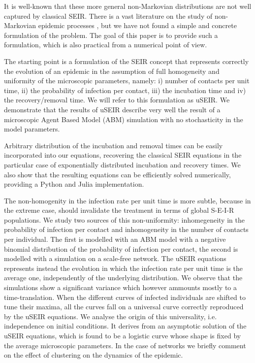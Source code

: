 \documentclass[a4paper,oneside,11pt]{article}
\begin{document}
It is well-known that these more general non-Markovian distributions are not well captured by classical SEIR. There is a vast literature on the study of non-Markovian epidemic processes \cite{}, but we have not found  a simple and concrete formulation of the problem. The goal of this paper is to provide such a formulation, which is also practical from a numerical point of view.  


The starting point is a formulation of the SEIR concept that   
represents correctly the evolution of an epidemic in the assumption of full homogeneity and uniformity of the microscopic parameters, namely: i) number of contacts per unit time, ii) the probability of infection per contact, iii) the incubation time and iv) the recovery/removal time. We will refer to this formulation as uSEIR. We demonstrate that the results of uSEIR describe very well the result of a microscopic Agent Based Model (ABM) simulation with no stochasticity in the model parameters.

Arbitrary distribution of the incubation and removal times can be easily  incorporated into our equations, recovering the classical SEIR equations in the particular case of exponentially distributed incubation and recovery times. We also show that the resulting equations can be efficiently solved numerically, providing a Python and Julia implementation. 

The non-homogenity in the infection rate per unit time is more subtle, because in the extreme case, should invalidate the treatment in terms of global S-E-I-R populations. We study two sources of this non-uniformity: inhomegeneity in the probability of infection per contact and inhomogeneity in the number of contacts per individual. The first is modelled with an ABM model with a negative binomial distribution of the probability of infection per contact, the second is modelled with a simulation on a scale-free network. The uSEIR equations represents instead the evolution in which the infection rate per unit time is the average one, independently of the underlying distribution. We observe that the simulations show a significant variance which however ammounts mostly to a time-translation. When the different curves of infected individuals are shifted to tune their maxima, all the curves fall on a universal curve correctly reproduced by the uSEIR equations. We analyse the origin of this universality, i.e. independence on initial conditions. It derives from an asymptotic solution of the uSEIR equations, which is found to be a logistic curve whose shape is fixed by the average microscopic parameters. In the case of networks we briefly comment on the effect of clustering on the dynamics of the epidemic. 
\end{document}
